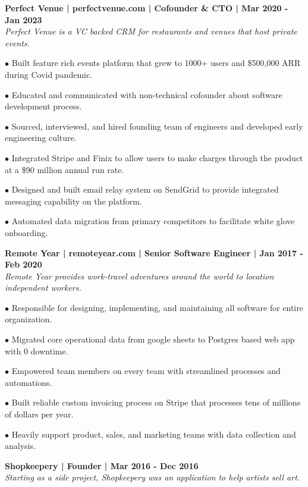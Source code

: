 \documentclass{article}
\begin{document}
	\begin{description}
	
	 \item \textbf{Perfect Venue | perfectvenue.com | Cofounder \& CTO | Mar 2020 - Jan 2023} \\
	 \textit{Perfect Venue is a VC backed CRM for restaurants and venues that host private events.}
	 \item$\bullet$ Built feature rich events platform that grew to 1000+ users and \$500,000 ARR during Covid pandemic.
	 	  \item$\bullet$ Educated and communicated with non-technical cofounder about software development process.

	 \item$\bullet$ Sourced, interviewed, and hired founding team of engineers and developed early engineering culture.

	  	 \item$\bullet$ Integrated Stripe and Finix to allow users to make charges through the product at a \$90 million annual run rate.
	 \item$\bullet$ Designed and built email relay system on SendGrid to provide integrated messaging capability on the platform.
	 \item$\bullet$ Automated data migration from primary competitors to facilitate white glove onboarding.
	
	 \item \textbf{Remote Year | remoteyear.com | Senior Software Engineer | Jan 2017 - Feb 2020} \\
	 \textit{Remote Year provides work-travel adventures around the world to location independent workers.}
	 \item$\bullet$ Responsible for designing, implementing, and maintaining all software for entire organization.
	 \item$\bullet$ Migrated core operational data from google sheets to Postgres based web app with 0 downtime.
	 \item$\bullet$ Empowered team members on every team with streamlined processes and automations.
	 \item$\bullet$ Built reliable custom invoicing process on Stripe that processes tens of millions of dollars per year.
	 \item$\bullet$ Heavily support product, sales, and marketing teams with data collection and analysis.
	
	 \item \textbf{Shopkeepery | Founder | Mar 2016 - Dec 2016} \\
	 \textit{Starting as a side project, Shopkeepery was an application to help artists sell art.}
	 

\end{description}
\end{document}
